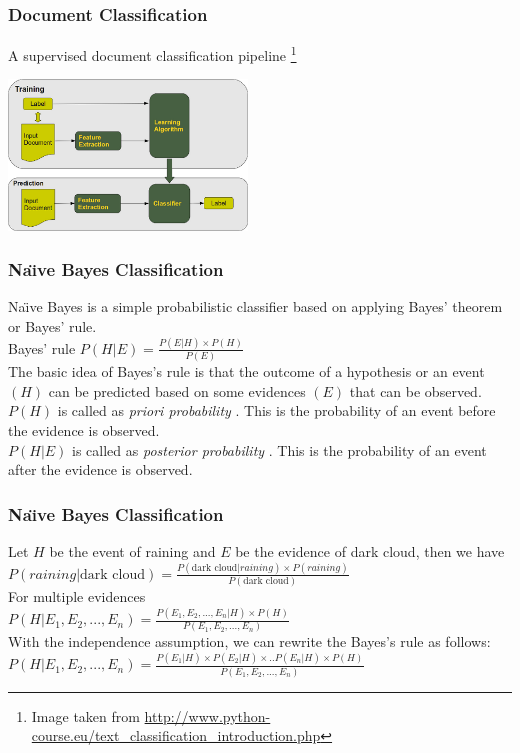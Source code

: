 \documentclass[serif,11pt,aspectratio=1610,table]{beamer}
\begin{document}
\begin{frame}[fragile]
 \frametitle{Document Classification}
A supervised document classification pipeline \footnote{Image taken from \url{http://www.python-course.eu/text_classification_introduction.php}}
\begin{center}
 \includegraphics[height=4cm]{supervised_learning.png}
\end{center}

\end{frame}

\begin{frame}[fragile]
 \frametitle{Na\"{\i}ve Bayes Classification}
 Na\"{\i}ve Bayes is a simple probabilistic classifier based on applying Bayes' theorem or Bayes' rule. \\
 Bayes' rule $ P(H|E) = \frac{P(E|H) \times P(H)}{P(E)}$ \\
 The basic idea of Bayes's rule is that the outcome of a hypothesis or an event $(H)$ can be predicted based
on some evidences $(E)$ that can be observed.\\
 $P(H)$ is called as \emph{priori probability} . This is the probability of an event before the evidence is observed.\\
 $P(H|E)$ is called as \emph{posterior probability} . This is the probability of an event after the evidence is
observed.
\end{frame}


\begin{frame}[fragile]
 \frametitle{Na\"{\i}ve Bayes Classification}
 Let $H$ be the event of raining and $E $ be the evidence of dark cloud, then we have \\
 $ P(raining | \text{dark cloud}) = \frac{P(\text{dark cloud} | raining) \times P(raining)}{P(\text{dark cloud})} $ \\
 For multiple evidences \\
 $ P(H|E_{1},E_{2},...,E_{n}) = \frac{P(E_{1},E_{2},...,E_{n} | H) \times P(H) }{P(E_{1},E_{2},...,E_{n})}$ \\
 With the independence assumption, we can rewrite the Bayes's rule as follows: \\
 $ P(H|E_{1},E_{2},...,E_{n}) = \frac{P(E_{1}|H) \times P(E_{2}|H) \times .. P(E_{n}|H) \times P(H)}{P(E_{1},E_{2},...,E_{n})}  $
\end{frame}
\end{document}
